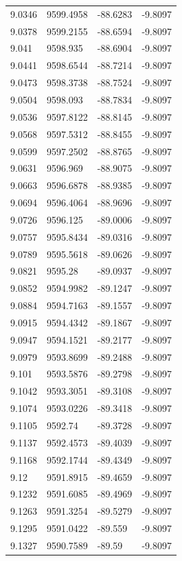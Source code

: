 \begin{table}[H]
\begin{tabular}{llll}
9.0346 & 9599.4958 & -88.6283 & -9.8097 \\
9.0378 & 9599.2155 & -88.6594 & -9.8097 \\
9.041 & 9598.935 & -88.6904 & -9.8097 \\
9.0441 & 9598.6544 & -88.7214 & -9.8097 \\
9.0473 & 9598.3738 & -88.7524 & -9.8097 \\
9.0504 & 9598.093 & -88.7834 & -9.8097 \\
9.0536 & 9597.8122 & -88.8145 & -9.8097 \\
9.0568 & 9597.5312 & -88.8455 & -9.8097 \\
9.0599 & 9597.2502 & -88.8765 & -9.8097 \\
9.0631 & 9596.969 & -88.9075 & -9.8097 \\
9.0663 & 9596.6878 & -88.9385 & -9.8097 \\
9.0694 & 9596.4064 & -88.9696 & -9.8097 \\
9.0726 & 9596.125 & -89.0006 & -9.8097 \\
9.0757 & 9595.8434 & -89.0316 & -9.8097 \\
9.0789 & 9595.5618 & -89.0626 & -9.8097 \\
9.0821 & 9595.28 & -89.0937 & -9.8097 \\
9.0852 & 9594.9982 & -89.1247 & -9.8097 \\
9.0884 & 9594.7163 & -89.1557 & -9.8097 \\
9.0915 & 9594.4342 & -89.1867 & -9.8097 \\
9.0947 & 9594.1521 & -89.2177 & -9.8097 \\
9.0979 & 9593.8699 & -89.2488 & -9.8097 \\
9.101 & 9593.5876 & -89.2798 & -9.8097 \\
9.1042 & 9593.3051 & -89.3108 & -9.8097 \\
9.1074 & 9593.0226 & -89.3418 & -9.8097 \\
9.1105 & 9592.74 & -89.3728 & -9.8097 \\
9.1137 & 9592.4573 & -89.4039 & -9.8097 \\
9.1168 & 9592.1744 & -89.4349 & -9.8097 \\
9.12 & 9591.8915 & -89.4659 & -9.8097 \\
9.1232 & 9591.6085 & -89.4969 & -9.8097 \\
9.1263 & 9591.3254 & -89.5279 & -9.8097 \\
9.1295 & 9591.0422 & -89.559 & -9.8097 \\
9.1327 & 9590.7589 & -89.59 & -9.8097 \\

\end{tabular}
\end{table}
